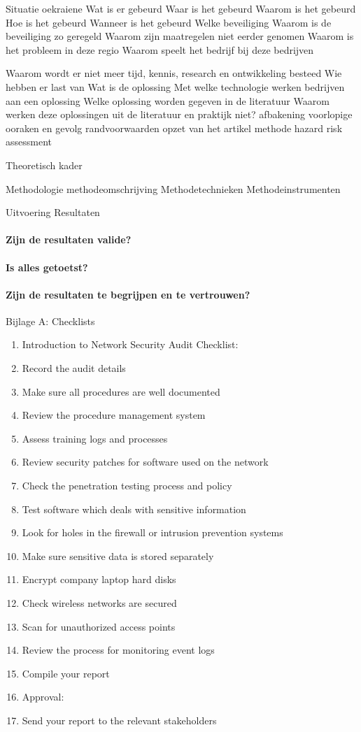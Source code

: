 {Situatie oekraiene
Wat is er gebeurd
Waar is het gebeurd
Waarom is het gebeurd
Hoe is het gebeurd
Wanneer is het gebeurd
Welke beveiliging
Waarom is de beveiliging zo geregeld
Waarom zijn maatregelen niet eerder genomen
Waarom is het probleem in deze regio
Waarom speelt het bedrijf bij deze bedrijven

Waarom wordt er niet meer tijd, kennis, research en ontwikkeling besteed
Wie hebben er last van
Wat is de oplossing
Met welke technologie werken bedrijven aan een oplossing
Welke oplossing worden gegeven in de literatuur
Waarom werken deze oplossingen uit de literatuur en praktijk niet?
afbakening
voorlopige ooraken en gevolg
randvoorwaarden
opzet van het artikel
methode hazard risk assessment

Theoretisch kader

Methodologie
methodeomschrijving
Methodetechnieken
Methodeinstrumenten

Uitvoering
Resultaten
 \paragraph{Zijn de resultaten valide?}

 \paragraph{Is alles getoetst?}

 \paragraph{Zijn de resultaten te begrijpen en te vertrouwen?}


Bijlage A: Checklists
\begin{enumerate}
\item Introduction to Network Security Audit Checklist:
\item Record the audit details
\item Make sure all procedures are well documented
\item Review the procedure management system
\item Assess training logs and processes
\item Review security patches for software used on the network
\item Check the penetration testing process and policy
\item Test software which deals with sensitive information
\item Look for holes in the firewall or intrusion prevention systems
\item Make sure sensitive data is stored separately
\item Encrypt company laptop hard disks
\item Check wireless networks are secured
\item Scan for unauthorized access points
\item Review the process for monitoring event logs
\item Compile your report
\item Approval:
\item Send your report to the relevant stakeholders
\end{enumerate}

}
